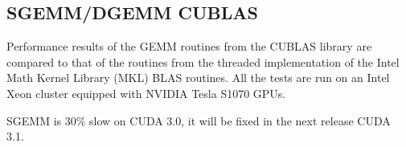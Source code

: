 \subsection{SGEMM/DGEMM CUBLAS}
\label{sec:sgemmdgemm-cublas}


Performance results of the GEMM routines from the CUBLAS library are
compared to that of the routines from the threaded implementation of
the Intel Math Kernel Library (MKL) BLAS routines. All the tests are
run on an Intel Xeon cluster equipped with NVIDIA Tesla S1070 GPUs.

SGEMM is 30\% slow on CUDA 3.0, it will be fixed in the next release
CUDA 3.1. 

